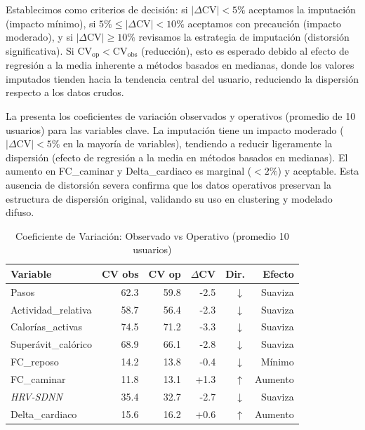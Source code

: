 Establecimos como criterios de decisión: si $|\Delta\text{CV}| < 5\%$ aceptamos la imputación (impacto mínimo), si $5\% \leq |\Delta\text{CV}| < 10\%$ aceptamos con precaución (impacto moderado), y si $|\Delta\text{CV}| \geq 10\%$ revisamos la estrategia de imputación (distorsión significativa). Si $\text{CV}_{\text{op}} < \text{CV}_{\text{obs}}$ (reducción), esto es esperado debido al efecto de regresión a la media inherente a métodos basados en medianas, donde los valores imputados tienden hacia la tendencia central del usuario, reduciendo la dispersión respecto a los datos crudos.

La  presenta los coeficientes de variación observados y operativos (promedio de 10 usuarios) para las variables clave. La imputación tiene un impacto moderado ($|\Delta\text{CV}| < 5\%$ en la mayoría de variables), tendiendo a reducir ligeramente la dispersión (efecto de regresión a la media en métodos basados en medianas). El aumento en FC\_caminar y Delta\_cardiaco es marginal ($<2\%$) y aceptable. Esta ausencia de distorsión severa confirma que los datos operativos preservan la estructura de dispersión original, validando su uso en clustering y modelado difuso.

\begin{table}[H]
    \centering
    \caption{Coeficiente de Variación: Observado vs Operativo (promedio 10 usuarios)}
    \label{tab:variabilidad_dual}
    \scriptsize
    \begin{tabular}{@{}lrrrrr@{}}
        \toprule
        \textbf{Variable} & \textbf{CV obs} & \textbf{CV op} & \textbf{$\Delta$CV} & \textbf{Dir.} & \textbf{Efecto} \\
        \midrule
        Pasos                   & 62.3 & 59.8 & -2.5 & $\downarrow$ & Suaviza \\
        Actividad\_relativa     & 58.7 & 56.4 & -2.3 & $\downarrow$ & Suaviza \\
        Calorías\_activas       & 74.5 & 71.2 & -3.3 & $\downarrow$ & Suaviza \\
        Superávit\_calórico     & 68.9 & 66.1 & -2.8 & $\downarrow$ & Suaviza \\
        FC\_reposo              & 14.2 & 13.8 & -0.4 & $\downarrow$ & Mínimo \\
        FC\_caminar             & 11.8 & 13.1 & +1.3 & $\uparrow$ & Aumento \\
        \textit{HRV-SDNN}               & 35.4 & 32.7 & -2.7 & $\downarrow$ & Suaviza \\
        Delta\_cardiaco         & 15.6 & 16.2 & +0.6 & $\uparrow$ & Aumento \\
        \bottomrule
    \end{tabular}
\end{table}

